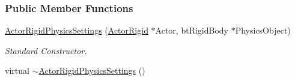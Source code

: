 \subsubsection*{Public Member Functions}
\begin{DoxyCompactItemize}
\item 
\hyperlink{classphys_1_1ActorRigidPhysicsSettings_a002e4932e1d8192a7aa45c1e4c159774}{ActorRigidPhysicsSettings} (\hyperlink{classphys_1_1ActorRigid}{ActorRigid} $\ast$Actor, btRigidBody $\ast$PhysicsObject)
\begin{DoxyCompactList}\small\item\em Standard Constructor. \item\end{DoxyCompactList}\item 
\hypertarget{classphys_1_1ActorRigidPhysicsSettings_a8c8d4581ff653208bbe5ddaad84feb4d}{
virtual \hyperlink{classphys_1_1ActorRigidPhysicsSettings_a8c8d4581ff653208bbe5ddaad84feb4d}{$\sim$ActorRigidPhysicsSettings} ()}
\label{classphys_1_1ActorRigidPhysicsSettings_a8c8d4581ff653208bbe5ddaad84feb4d}


\end{DoxyCompactItemize}
